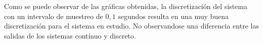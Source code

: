 \documentclass{article}
\begin{document}
Como se puede observar de las gráficas obtenidas, la discretización del sistema con un intervalo de muestreo de $0,1$ segundos resulta en una muy buena discretización para el sistema en estudio.
No observandose una diferencia entre las salidas de los sistemas contínuo y discreto.







    
\end{document}
